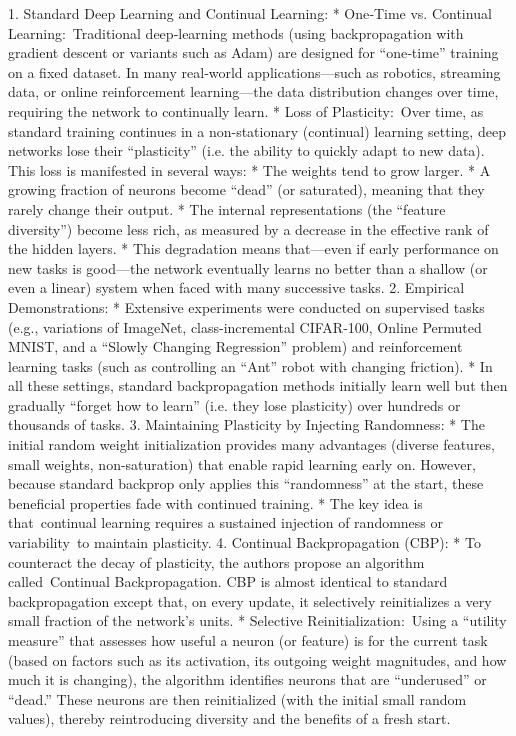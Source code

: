 1. Standard Deep Learning and Continual Learning:
    * One‐Time vs. Continual Learning: Traditional deep‐learning methods (using backpropagation with gradient descent or variants such as Adam) are designed for “one‐time” training on a fixed dataset. In many real‐world applications—such as robotics, streaming data, or online reinforcement learning—the data distribution changes over time, requiring the network to continually learn.
    * Loss of Plasticity: Over time, as standard training continues in a non-stationary (continual) learning setting, deep networks lose their “plasticity” (i.e. the ability to quickly adapt to new data). This loss is manifested in several ways:
        * The weights tend to grow larger.
        * A growing fraction of neurons become “dead” (or saturated), meaning that they rarely change their output.
        * The internal representations (the “feature diversity”) become less rich, as measured by a decrease in the effective rank of the hidden layers.
    * This degradation means that—even if early performance on new tasks is good—the network eventually learns no better than a shallow (or even a linear) system when faced with many successive tasks.
2. Empirical Demonstrations:
    * Extensive experiments were conducted on supervised tasks (e.g., variations of ImageNet, class-incremental CIFAR‑100, Online Permuted MNIST, and a “Slowly Changing Regression” problem) and reinforcement learning tasks (such as controlling an “Ant” robot with changing friction).
    * In all these settings, standard backpropagation methods initially learn well but then gradually “forget how to learn” (i.e. they lose plasticity) over hundreds or thousands of tasks.
3. Maintaining Plasticity by Injecting Randomness:
    * The initial random weight initialization provides many advantages (diverse features, small weights, non-saturation) that enable rapid learning early on. However, because standard backprop only applies this “randomness” at the start, these beneficial properties fade with continued training.
    * The key idea is that continual learning requires a sustained injection of randomness or variability to maintain plasticity.
4. Continual Backpropagation (CBP):
    * To counteract the decay of plasticity, the authors propose an algorithm called Continual Backpropagation. CBP is almost identical to standard backpropagation except that, on every update, it selectively reinitializes a very small fraction of the network’s units.
    * Selective Reinitialization: Using a “utility measure” that assesses how useful a neuron (or feature) is for the current task (based on factors such as its activation, its outgoing weight magnitudes, and how much it is changing), the algorithm identifies neurons that are “underused” or “dead.” These neurons are then reinitialized (with the initial small random values), thereby reintroducing diversity and the benefits of a fresh start.
